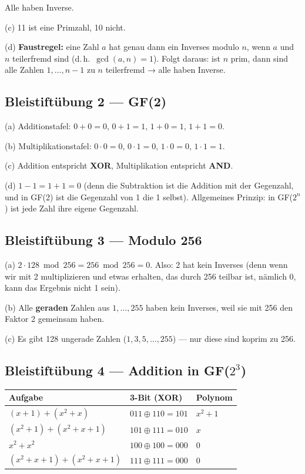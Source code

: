Alle haben Inverse.

(c) 11 ist eine Primzahl, 10 nicht.

(d) \textbf{Faustregel:} eine Zahl $a$ hat genau dann ein Inverses
modulo $n$, wenn $a$ und $n$ teilerfremd sind (d.\,h.\
$\gcd(a, n) = 1$). Folgt daraus: ist $n$ prim, dann sind alle Zahlen
$1, \dots, n-1$ zu $n$ teilerfremd → alle haben Inverse.

\subsection*{Bleistiftübung 2 — GF(2)}

(a) Additionstafel: $0+0=0$, $0+1=1$, $1+0=1$, $1+1=0$.

(b) Multiplikationstafel: $0 \cdot 0=0$, $0 \cdot 1=0$, $1 \cdot 0=0$,
$1 \cdot 1=1$.

(c) Addition entspricht \textbf{XOR}, Multiplikation entspricht
\textbf{AND}.

(d) $1 - 1 = 1 + 1 = 0$ (denn die Subtraktion ist die Addition mit
der Gegenzahl, und in GF(2) ist die Gegenzahl von 1 die 1 selbst).
Allgemeines Prinzip: in GF($2^n$) ist jede Zahl ihre eigene
Gegenzahl.

\subsection*{Bleistiftübung 3 — Modulo 256}

(a) $2 \cdot 128 \bmod 256 = 256 \bmod 256 = 0$. Also: 2 hat kein
Inverses (denn wenn wir mit 2 multiplizieren und etwas erhalten, das
durch 256 teilbar ist, nämlich 0, kann das Ergebnis nicht 1 sein).

(b) Alle \textbf{geraden} Zahlen aus $1, \dots, 255$ haben kein
Inverses, weil sie mit 256 den Faktor 2 gemeinsam haben.

(c) Es gibt 128 ungerade Zahlen ($1, 3, 5, \dots, 255$) — nur diese
sind koprim zu 256.

\subsection*{Bleistiftübung 4 — Addition in GF($2^3$)}

\begin{center}
\begin{tabular}{lll}
  \toprule
  Aufgabe & 3-Bit (XOR) & Polynom \\
  \midrule
  $(x+1) + (x^2+x)$            & $011 \oplus 110 = 101$ & $x^2+1$ \\
  $(x^2+1) + (x^2+x+1)$        & $101 \oplus 111 = 010$ & $x$ \\
  $x^2 + x^2$                  & $100 \oplus 100 = 000$ & $0$ \\
  $(x^2+x+1) + (x^2+x+1)$      & $111 \oplus 111 = 000$ & $0$ \\
  \bottomrule
\end{tabular}
\end{center}

